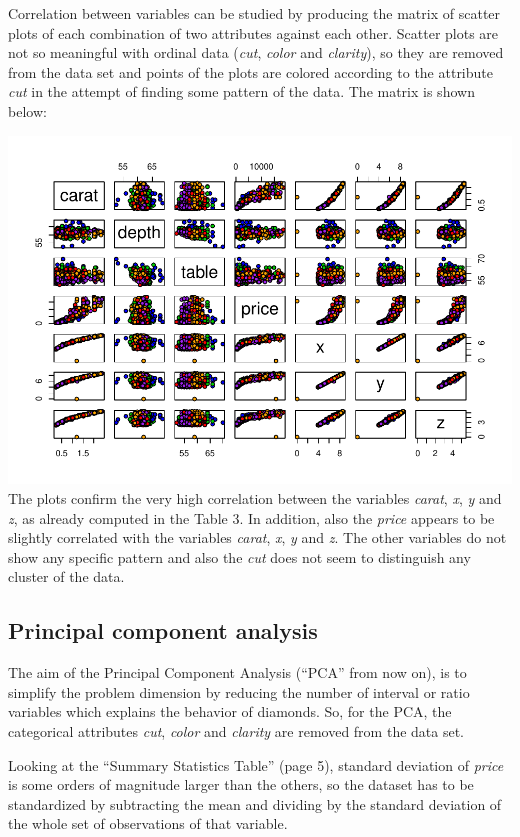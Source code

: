 \documentclass[
]{article}
\begin{document}
Correlation between variables can be studied by producing the matrix of
scatter plots of each combination of two attributes against each other.
Scatter plots are not so meaningful with ordinal data (\emph{cut},
\emph{color} and \emph{clarity}), so they are removed from the data set
and points of the plots are colored according to the attribute
\emph{cut} in the attempt of finding some pattern of the data. The
matrix is shown below:

\includegraphics{Report_files/figure-latex/unnamed-chunk-9-1.pdf} The
plots confirm the very high correlation between the variables
\emph{carat}, \emph{x}, \emph{y} and \emph{z}, as already computed in
the Table 3. In addition, also the \emph{price} appears to be slightly
correlated with the variables \emph{carat}, \emph{x}, \emph{y} and
\emph{z}. The other variables do not show any specific pattern and also
the \emph{cut} does not seem to distinguish any cluster of the data.

\subsection{Principal component
analysis}\label{principal-component-analysis}

The aim of the Principal Component Analysis (``PCA'' from now on), is to
simplify the problem dimension by reducing the number of interval or
ratio variables which explains the behavior of diamonds. So, for the
PCA, the categorical attributes \emph{cut}, \emph{color} and
\emph{clarity} are removed from the data set.

Looking at the ``Summary Statistics Table'' (page 5), standard deviation
of \emph{price} is some orders of magnitude larger than the others, so
the dataset has to be standardized by subtracting the mean and dividing
by the standard deviation of the whole set of observations of that
variable.
\end{document}
